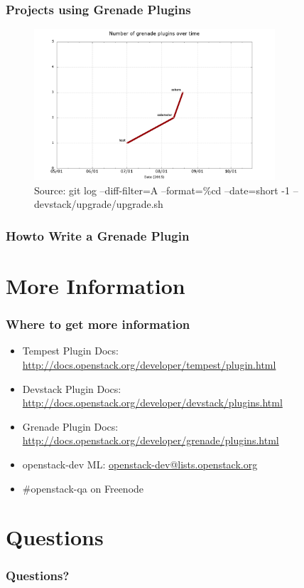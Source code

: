 \documentclass[aspectratio=169,11pt,hyperref={colorlinks=true}]{beamer}
\begin{document}
\begin{frame}
	\frametitle{Projects using Grenade Plugins}
    \begin{figure}[p]
    	\centering
    	\includegraphics[width=0.8\textwidth]{grenade-plugins.png}
    	\caption{Source: git log --diff-filter=A --format=\%cd --date=short -1 -- devstack/upgrade/upgrade.sh}
    \end{figure}
\end{frame}

\begin{frame}
    \frametitle{Howto Write a Grenade Plugin}
\end{frame}

\section{More Information}
\begin{frame}
\frametitle{Where to get more information}
    \begin{itemize}
        \item Tempest Plugin Docs: \href{http://docs.openstack.org/developer/tempest/plugin.html}{http://docs.openstack.org/developer/tempest/plugin.html}
        \item Devstack Plugin Docs: \href{http://docs.openstack.org/developer/devstack/plugins.html}{http://docs.openstack.org/developer/devstack/plugins.html}
        \item Grenade Plugin Docs: \href{http://docs.openstack.org/developer/grenade/plugins.html}{http://docs.openstack.org/developer/grenade/plugins.html}
        \item openstack-dev ML: \href{mailto:openstack-dev@lists.openstack.org}{openstack-dev@lists.openstack.org}
        \item \#openstack-qa on Freenode
    \end{itemize}
\end{frame}

\section{Questions}
\begin{frame}
\frametitle{Questions?}
\end{frame}

\end{document}
